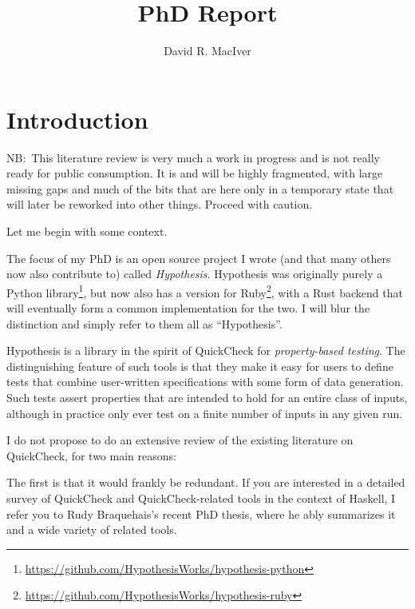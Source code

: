 

\title{PhD Report}
\author{David R. MacIver}



\maketitle

\tableofcontents

\chapter{Introduction}

NB:\ This literature review is very much a work in progress and is not really ready for public consumption.
It is and will be highly fragmented,
with large missing gaps and much of the bits that are here only in a temporary state that will later be reworked into other things.
Proceed with caution.

Let me begin with some context.

The focus of my PhD is an open source project I wrote (and that many others now also contribute to) called \emph{Hypothesis}.
Hypothesis was originally purely a Python library\footnote{\url{https://github.com/HypothesisWorks/hypothesis-python}},
but now also has a version for Ruby\footnote{\url{https://github.com/HypothesisWorks/hypothesis-ruby}},
with a Rust backend that will eventually form a common implementation for the two.
I will blur the distinction and simply refer to them all as ``Hypothesis''.

Hypothesis is a library in the spirit of QuickCheck\cite{DBLP:conf/icfp/ClaessenH00} for \emph{property-based testing}.
The distinguishing feature of such tools is that they make it easy for users to define tests that combine user-written specifications with some form of data generation.
Such tests assert properties that are intended to hold for an entire class of inputs,
although in practice only ever test on a finite number of inputs in any given run.

I do not propose to do an extensive review of the existing literature on QuickCheck,
for two main reasons:

The first is that it would frankly be redundant.
If you are interested in a detailed survey of QuickCheck and QuickCheck-related tools in the context of Haskell,
I refer you to Rudy Braquehais's recent PhD thesis\cite{matela2017tools},
where he ably summarizes it and a wide variety of related tools.

